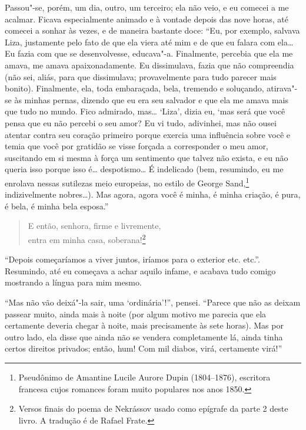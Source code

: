Passou"-se, porém, um dia, outro, um terceiro; ela não veio, e eu comecei
a me acalmar. Ficava especialmente animado e à vontade depois das nove
horas, até comecei a sonhar às vezes, e de maneira bastante doce: “Eu,
por exemplo, salvava Liza, justamente pelo fato de que ela viera até
mim e de que eu falara com ela\ldots{} Eu fazia com que se desenvolvesse,
educava"-a. Finalmente, percebia que ela me amava, me amava
apaixonadamente. Eu dissimulava, fazia que não compreendia (não sei,
aliás, para que dissimulava; provavelmente para tudo parecer mais
bonito). Finalmente, ela, toda embaraçada, bela, tremendo e soluçando,
atirava"-se às minhas pernas, dizendo que eu era seu salvador e que ela
me amava mais que tudo no mundo. Fico admirado, mas\ldots{} ‘Liza’, dizia
eu, ‘mas será que você pensa que eu não percebi o seu amor? Eu vi tudo,
adivinhei, mas não ousei atentar contra seu coração primeiro porque
exercia uma influência sobre você e temia que você por gratidão se
visse forçada a corresponder o meu amor, suscitando em si mesma à força um 
sentimento que talvez não exista, e eu não queria isso porque
isso é\ldots{} despotismo\ldots{} É indelicado (bem, resumindo, eu me enrolava
nessas sutilezas meio europeias, no estilo de George Sand,\footnote{
Pseudônimo de Amantine Lucile Aurore Dupin (1804--1876), escritora
francesa cujos romances foram muito populares nos anos 1850.}
indizivelmente nobres\ldots{}). Mas agora, agora você é minha, é minha
criação, é pura, é bela, é minha bela esposa.''

\medskip

\begin{verse}
E então, senhora, firme e livremente,\\
entra em minha casa, soberana!\footnote{ Versos finais do poema de
Nekrássov usado como epígrafe da parte 2 deste livro. A tradução é de Rafael
Frate.}
\end{verse}

\medskip

``Depois começaríamos a viver juntos, iríamos para o exterior etc. etc.''.
Resumindo, até eu começava a achar aquilo infame, e acabava tudo comigo
mostrando a língua para mim mesmo.

“Mas não vão deixá"-la sair, uma ‘ordinária’!”, pensei. “Parece que não
as deixam passear muito, ainda mais à noite (por algum motivo me
parecia que ela certamente deveria chegar à noite, mais precisamente às
sete horas). Mas por outro lado, ela disse que ainda não se vendera
completamente lá, ainda tinha certos direitos privados; então, hum! Com
mil diabos, virá, certamente virá!”

